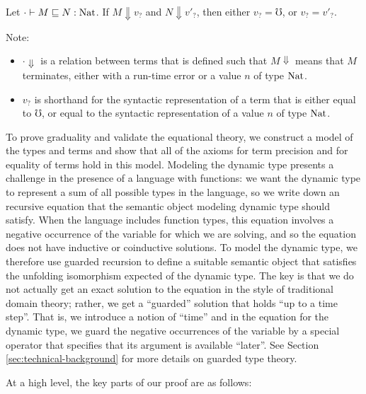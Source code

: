 \begin{theorem}[Graduality]
  Let $\cdot \vdash M \sqsubseteq N : \text{Nat}$. 
  If $M \Downarrow v_?$ and $N \Downarrow v'_?$, then either $v_? = \mho$, or $v_? = v'_?$.
\end{theorem}

Note:
\begin{itemize}

  \item $\cdot \Downarrow$ is a relation between terms that is defined such that $M \Downarrow$ means
  that $M$ terminates, either with a run-time error or a value $n$ of type $\text{Nat}$.

  \item $v_?$ is shorthand for the syntactic representation of a term that is either equal to
  $\mho$, or equal to the syntactic representation of a value $n$ of type $\text{Nat}$.
\end{itemize}


To prove graduality and validate the equational theory, we construct a model of the types
and terms and show that all of the axioms for term precision and for equality of terms
hold in this model. Modeling the dynamic type presents a challenge in the presence of a
language with functions: we want the dynamic type to represent a sum of all possible types
in the language, so we write down an recursive equation that the semantic object modeling
dynamic type should satisfy. When the language includes function types, this equation involves a
negative occurrence of the variable for which we are solving, and so the equation 
does not have inductive or coinductive solutions.
%
To model the dynamic type, we therefore use guarded recursion to define a suitable
semantic object that satisfies the unfolding isomorphism expected of the dynamic type.
The key is that we do not actually get an exact solution to the equation in the style
of traditional domain theory; rather, we get a ``guarded'' solution that holds ``up to a time step''.
%
That is, we introduce a notion of ``time'' and in the equation for the dynamic type,
we guard the negative occurrences of the variable by a special operator that
specifies that its argument is available ``later''.
See Section \ref{sec:technical-background} for more details on guarded type theory.

At a high level, the key parts of our proof are as follows:

